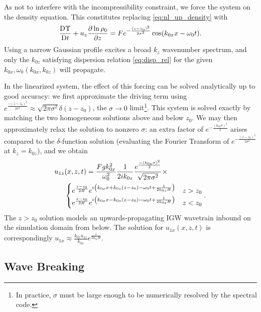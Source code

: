 \documentclass[twocolumn,
        nofootinbib, %
        usenames, %
        aps,
        prd,
        dvipsnames %
    ]{revtex4-1}%
\newcommand*{\pd}[2]{\frac{\partial#1}{\partial#2}}
\newcommand*{\md}[2]{\frac{\mathrm{D}#1}{\mathrm{D}#2}}
\DeclarePairedDelimiter\p{\lparen}{\rparen}
\begin{document}
As not to interfere with the incompressibility constraint, we force the system
on the density equation. This constitutes replacing \autoref{eq:nl_up_density}
with
\begin{equation}
    \md{\Upsilon}{t} + u_z\pd{\ln \rho_0}{z}
        = Fe^{-\frac{(z - z_0)^2}{2\sigma^2}}
            \cos \p*{k_{0x}x - \omega_0 t}.\label{eq:vol_drive}
\end{equation}
Using a narrow Gaussian profile excites a broad $k_z$ wavenumber spectrum, and
only the $k_{0z}$ satisfying dispersion relation \autoref{eq:disp_rel} for the
given $k_{0x}, \omega_0(k_{0x}, k_{0z})$ will propagate.

In the linearized system, the effect of this forcing can be solved analytically
up to good accuracy: we first approximate the driving term using
$e^{\frac{-(z - z_0)^2}{2\sigma^2}} \approx \sqrt{2\pi \sigma^2}\delta(z -
z_0)$, the $\sigma \to 0$ limit\footnote{In practice, $\sigma$ must be large
enough to be numerically resolved by the spectral code.}. This system is solved
exactly by matching the two homogeneous solutions above and below $z_0$. We may
then approximately relax the solution to nonzero $\sigma$: an extra factor of
$e^{-\frac{(k_{0z}\sigma)^2}{2}}$ arises compared to the $\delta$-function
solution (evaluating the Fourier Transform of $e^{-\frac{(z -
z_0)^2}{2\sigma^2}}$ at $k_z = k_{0z}$), and we obtain
\begin{align}
    u_{1z}&(x, z, t) ={} \frac{Fgk_{0x}^2}{\omega_0^2}
        \frac{1}{2ik_{0z}}\frac{e^{\frac{-(k_{0z}\sigma)^2}{2}}}
        {\sqrt{2\pi\sigma^2}} \times\nonumber\\
        &{}\begin{cases}
        e^{\frac{z - z_0}{2H}}e^{i\p*{k_{0x}x + k_{0z}(z - z_0) - \omega_0 t
            + \frac{1}{2k_{0z}H}}}
            & z > z_0\\
        e^{\frac{z - z_0}{2H}}e^{i\p*{k_{0x}x - k_{0z}(z - z_0) - \omega_0 t
            + \frac{1}{2k_{0z}H}}}
            & z < z_0\\
    \end{cases}.\label{eq:uz_lin}
\end{align}
The $z > z_0$ solution models an upwards-propagating IGW wavetrain inbound on
the simulation domain from below. The solution for $u_{1x}(x, z, t)$ is
correspondingly $u_{1x} \approx \frac{k_{0z}
u_{1z}}{k_{0x}}e^{\frac{i}{2k_{0z}H}}$.

\subsection{Wave Breaking}
\end{document}
